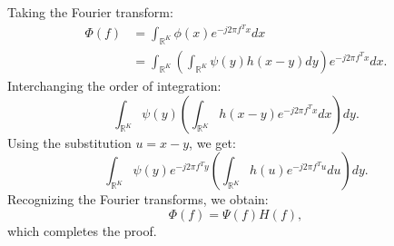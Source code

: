 \documentclass{article}
\begin{document}
Taking the Fourier transform:
\begin{align*}
    \Phi(f) &= \int_{\mathbb{R}^K} \phi(x) e^{-j 2\pi f^T x} dx \\
    &= \int_{\mathbb{R}^K} \left( \int_{\mathbb{R}^K} \psi(y) h(x-y) dy \right) e^{-j 2\pi f^T x} dx.
\end{align*}
Interchanging the order of integration:
\begin{equation}
    \int_{\mathbb{R}^K} \psi(y) \left( \int_{\mathbb{R}^K} h(x-y) e^{-j 2\pi f^T x} dx \right) dy.
\end{equation}
Using the substitution $u = x - y$, we get:
\begin{equation}
    \int_{\mathbb{R}^K} \psi(y) e^{-j 2\pi f^T y} \left( \int_{\mathbb{R}^K} h(u) e^{-j 2\pi f^T u} du \right) dy.
\end{equation}
Recognizing the Fourier transforms, we obtain:
\begin{equation}
    \Phi(f) = \Psi(f) H(f),
\end{equation}
which completes the proof.
\end{document}
